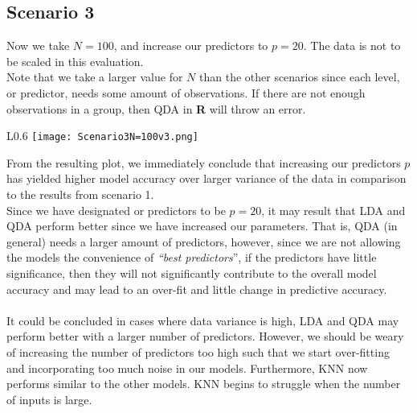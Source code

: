 \documentclass[11pt, oneside]{article}
\begin{document}



\subsection*{Scenario 3} %

Now we take $N=100$, and increase our predictors to $p=20$. The data is not to be scaled in this evaluation.\\
Note that we take a larger value for $N$ than the other scenarios since each level, or predictor, needs some amount of observations. If there are not enough observations in a group, then QDA in \textbf\textsf{R} will throw an error.\\

 
\begin{wrapfigure}[]{L}{0.6\textwidth}
\vspace{-0.55cm}
\texttt{[image: Scenario3N=100v3.png]}
\vspace{-0.5cm}
\end{wrapfigure}

From the resulting plot, we immediately conclude that increasing our predictors $p$ has yielded higher model accuracy over larger variance of the data in comparison to the results from scenario 1.\\
Since we have designated or predictors to be $p=20$, it may result that LDA and QDA perform better since we have increased our parameters. 
That is, QDA  (in general) needs a larger amount of predictors, however, since we are not allowing the models the convenience of \emph{``best predictors}'', if the predictors have little significance, then they will not significantly contribute to the overall model accuracy and may lead to an over-fit and little change in predictive accuracy.\\
\\
It could be concluded in cases where data variance is high, LDA and QDA may perform better with a larger number of predictors. However, we should be weary of increasing the number of predictors too high such that we start over-fitting and incorporating too much noise in our models. Furthermore, KNN now performs similar to the other models. KNN begins to struggle when the number of inputs is large.


\pagebreak
\end{document}
